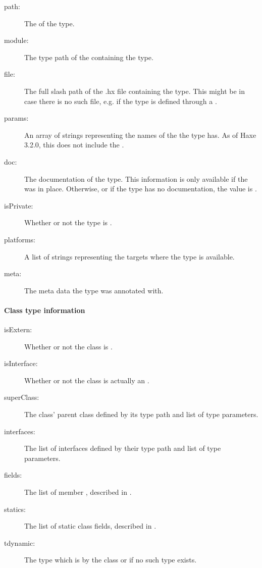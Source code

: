\begin{description}
	\item[path:] The  of the type.
	\item[module:] The type path of the  containing the type.
	\item[file:] The full slash path of the .hx file containing the type. This might be  in case there is no such file, e.g. if the type is defined through a .
	\item[params:] An array of strings representing the names of the  the type has. As of Haxe 3.2.0, this does not include the .
	\item[doc:] The documentation of the type. This information is only available if the   was in place. Otherwise, or if the type has no documentation, the value is .
	\item[isPrivate:] Whether or not the type is .
	\item[platforms:] A list of strings representing the targets where the type is available.
	\item[meta:] The meta data the type was annotated with.
\end{description}
	
\paragraph{Class type information}
\label{cr-rtti-class-type-information}

\begin{description}
	\item[isExtern:] Whether or not the class is .
	\item[isInterface:] Whether or not the class is actually an .
	\item[superClass:] The class' parent class defined by its type path and list of type parameters.
	\item[interfaces:] The list of interfaces defined by their type path and list of type parameters.
	\item[fields:] The list of member , described in .
	\item[statics:] The list of static class fields, described in .
	\item[tdynamic:] The type which is  by the class or  if no such type exists.
\end{description}

